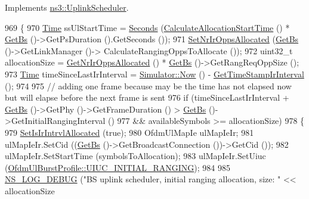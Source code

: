 Implements \hyperlink{classns3_1_1UplinkScheduler_ae6094447ffd6d3946a70723246faed42}{ns3\+::\+Uplink\+Scheduler}.


\begin{DoxyCode}
969 \{
970   \hyperlink{namespacens3_1_1TracedValueCallback_a7ffd3e7c142ffe7c8a1d2db9b8de38ec}{Time} ssUlStartTime = \hyperlink{group__timecivil_ga33c34b816f8ff6628e33d5c8e9713b9e}{Seconds} (\hyperlink{classns3_1_1UplinkSchedulerMBQoS_a3e3b4dc0dd31f8750cee914c18c6cd6e}{CalculateAllocationStartTime} () * 
      \hyperlink{classns3_1_1UplinkScheduler_afe61b7de71d92d2dff1b135744a6ff7e}{GetBs} ()->GetPsDuration ().GetSeconds ());
971   \hyperlink{classns3_1_1UplinkScheduler_a19208ce138c5e13b1a7019a67adef892}{SetNrIrOppsAllocated} (\hyperlink{classns3_1_1UplinkScheduler_afe61b7de71d92d2dff1b135744a6ff7e}{GetBs} ()->GetLinkManager ()->
      CalculateRangingOppsToAllocate ());
972   uint32\_t allocationSize = \hyperlink{classns3_1_1UplinkScheduler_a9a2cbb04c1e84a028fc1545e8f054b80}{GetNrIrOppsAllocated} () * \hyperlink{classns3_1_1UplinkScheduler_afe61b7de71d92d2dff1b135744a6ff7e}{GetBs} ()->GetRangReqOppSize 
      ();
973   \hyperlink{namespacens3_1_1TracedValueCallback_a7ffd3e7c142ffe7c8a1d2db9b8de38ec}{Time} timeSinceLastIrInterval = \hyperlink{classns3_1_1Simulator_ac3178fa975b419f7875e7105be122800}{Simulator::Now} () - 
      \hyperlink{classns3_1_1UplinkScheduler_aa7516e5a55b513a7640035a9783369c7}{GetTimeStampIrInterval} ();
974 
975   \textcolor{comment}{// adding one frame because may be the time has not elapsed now but will elapse before the next frame is
       sent}
976   \textcolor{keywordflow}{if} (timeSinceLastIrInterval + \hyperlink{classns3_1_1UplinkScheduler_afe61b7de71d92d2dff1b135744a6ff7e}{GetBs} ()->GetPhy ()->GetFrameDuration () > 
      \hyperlink{classns3_1_1UplinkScheduler_afe61b7de71d92d2dff1b135744a6ff7e}{GetBs} ()->GetInitialRangingInterval ()
977       && availableSymbols >= allocationSize)
978     \{
979       \hyperlink{classns3_1_1UplinkScheduler_a3eee0d06486678eab4d352a274676d95}{SetIsIrIntrvlAllocated} (\textcolor{keyword}{true});
980       OfdmUlMapIe ulMapIeIr;
981       ulMapIeIr.SetCid ((\hyperlink{classns3_1_1UplinkScheduler_afe61b7de71d92d2dff1b135744a6ff7e}{GetBs} ()->GetBroadcastConnection ())->GetCid ());
982       ulMapIeIr.SetStartTime (symbolsToAllocation);
983       ulMapIeIr.SetUiuc (\hyperlink{classns3_1_1OfdmUlBurstProfile_ae528783c4b3c6700ff49dfd7a555cb3daaea7b6256d4bcd0125f0248c0560c94e}{OfdmUlBurstProfile::UIUC\_INITIAL\_RANGING});
984 
985       \hyperlink{group__logging_ga413f1886406d49f59a6a0a89b77b4d0a}{NS\_LOG\_DEBUG} (\textcolor{stringliteral}{"BS uplink scheduler, initial ranging allocation, size: "} << allocationSize

\end{DoxyCode}
